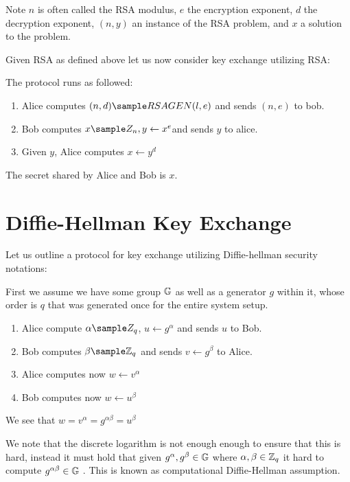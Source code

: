 Note \(n\) is often called the RSA modulus, \(e\) the encryption exponent, \(d\) the decryption exponent, \((n,y)\) an instance of the RSA problem, and \(x\) a solution to the problem.     

Given RSA as defined above let us now consider key exchange utilizing RSA:

The protocol runs as followed: 
\begin{enumerate}
    \item Alice computes \((n,d) \sample RSAGEN(l, e) \) and sends \((n,e)\) to bob. 
    \item Bob computes \(x \sample Z_n, y \gets x^e\)and sends \(y\) to alice. 
    \item Given \(y\), Alice computes \(x \gets y^d\)      
\end{enumerate}
    The secret shared by Alice and Bob is \(x\). 

\section{Diffie-Hellman Key Exchange}

Let us outline a protocol for key exchange utilizing Diffie-hellman security notations:

First we assume we have some group \(\mathbb{G}\) as well as a generator \(g\) within it, whose order is \(q\) that was generated once for the entire system setup.  
\begin{enumerate}
    \item Alice compute \(\alpha  \sample Z_q\), \(u \gets g^\alpha \) and sends \(u\) to Bob. 
    \item Bob computes  \(\beta \sample \Z_q\) and sends \(v \gets g^\beta \) to Alice. 
    \item Alice computes now \(w \gets v^\alpha \)
    \item Bob computes now \(w \gets u^\beta \)      
\end{enumerate}
We see that \(w = v^\alpha  = g^{\alpha \beta }= u^\beta \) 

We note that the discrete logarithm is not enough enough to ensure that this is hard, instead it must hold that given \(g^\alpha , g^\beta \in \mathbb{G}\) where \(\alpha ,\beta  \in \mathbb{Z}_q\)  it hard to compute \(g^{\alpha \beta } \in \mathbb{G}\) . This is known as computational Diffie-Hellman assumption.

